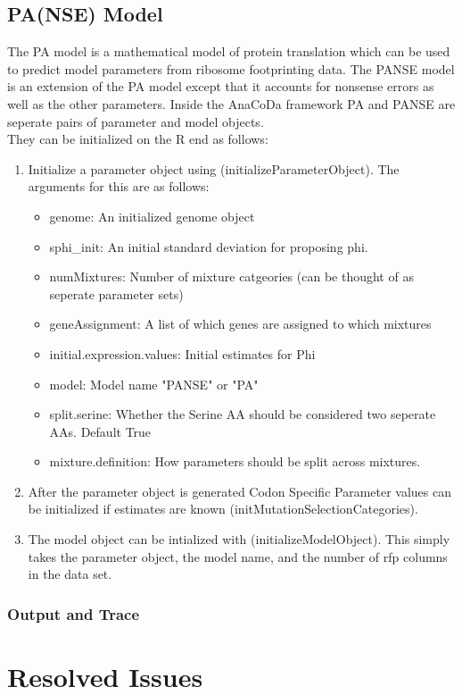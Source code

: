 \documentclass{article}
\begin{document}
\subsection{PA(NSE) Model}
The PA model is a mathematical model of protein translation which can be used to predict model parameters from ribosome footprinting data. The PANSE model is an extension of the PA model except that it accounts for nonsense errors as well as the other parameters. Inside the AnaCoDa framework PA and PANSE are seperate pairs of parameter and model objects.\\
They can be initialized on the R end as follows:
\begin{enumerate}
\item Initialize a parameter object using (initializeParameterObject). The arguments for this are as follows:
\begin{itemize}
\item genome: An initialized genome object
\item sphi\_init: An initial standard deviation for proposing phi.
\item numMixtures: Number of mixture catgeories (can be thought of as seperate parameter sets)
\item geneAssignment: A list of which genes are assigned to which mixtures
\item initial.expression.values: Initial estimates for Phi
\item model: Model name "PANSE" or "PA"
\item split.serine: Whether the Serine AA should be considered two seperate AAs. Default True
\item mixture.definition: How parameters should be split across mixtures.
\end{itemize}
\item After the parameter object is generated Codon Specific Parameter values can be initialized if estimates are known (initMutationSelectionCategories).
\item The model object can be intialized with (initializeModelObject). This simply takes the parameter object, the model name, and the number of rfp columns in the data set.
\end{enumerate}


\subsubsection{Output and Trace}


\section{Resolved Issues}
\end{document}
